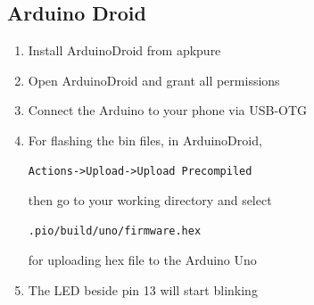 \subsection{Arduino Droid}
\begin{enumerate}[label=\arabic*.,ref=\theenumi]
\item Install ArduinoDroid from apkpure
\item Open ArduinoDroid and grant all permissions
\item Connect the Arduino to your phone via USB-OTG
\item For flashing the bin files, in ArduinoDroid,
\begin{lstlisting}
Actions->Upload->Upload Precompiled
\end{lstlisting}
then go to your working directory and select
\begin{lstlisting}
.pio/build/uno/firmware.hex
\end{lstlisting}
for uploading hex file to the Arduino Uno
\item The LED beside pin 13 will start
blinking
\end{enumerate}




